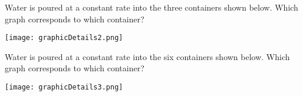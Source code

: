 \documentclass[nooutcomes]{ximera}
\begin{document}
\newpage


\begin{problem} \label{graphicDetails2}
Water is poured at a constant rate into the three containers shown
below. Which graph corresponds to which container?

\begin{center}
\texttt{[image: graphicDetails2.png]}
\end{center}


\end{problem}

\newpage

\begin{problem} \label{graphicDetails3}
Water is poured at a constant rate into the six containers shown
below. Which graph corresponds to which container?

\begin{center}
\texttt{[image: graphicDetails3.png]}
\end{center}


\end{problem}

\newpage
\end{document}
